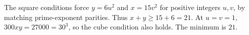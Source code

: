 The square conditions force $y=6u^2$ and $x=15v^2$ for positive integers $u,v$, by matching prime-exponent parities. Thus $x+y\ge15+6=21$. At $u=v=1$, $300xy=27000=30^3$, so the cube condition also holds. The minimum is $\boxed{21}$.
